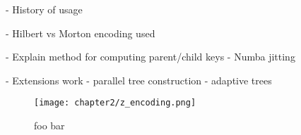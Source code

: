 - History of usage

- Hilbert vs Morton encoding used

- Explain method for computing parent/child keys
    - Numba jitting

- Extensions work
    - parallel tree construction
    - adaptive trees


\begin{figure}[!h]
    \centering
    {\texttt{[image: chapter2/z\_encoding.png]}}
    \vspace{0pt}
    \caption{
        foo bar
    }
    \label{fig:2_2_morton_encoding}
\end{figure}